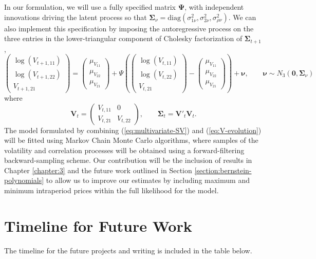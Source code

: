 	In our formulation, we will use a fully specified matrix $\boldsymbol{\Psi}$, with independent innovations driving the latent process so that $\boldsymbol{\Sigma}_{\nu} = \mbox{diag}(\sigma^2_{1\nu}, \sigma^2_{2\nu}, \sigma^2_{\rho\nu})$. We can also implement this specification by imposing the autoregressive process on the three entries in the lower-triangular component of Cholesky factorization of $\boldsymbol{\Sigma}_{t+1}$, 
\begin{equation}
	\left( \begin{array}{c} \log(V_{t+1,11}) \\ \log(V_{t+1,22}) \\ V_{t+1, 21} \end{array} \right) = \left( \begin{array}{c} \mu_{V_{11}} \\ \mu_{V_{22}} \\ \mu_{V_{21}} \end{array} \right) + \Psi \left( \left( \begin{array}{c} \log(V_{t,11}) \\ \log(V_{t,22}) \\ V_{t, 21} \end{array} \right) -\left( \begin{array}{c} \mu_{V_{11}} \\ \mu_{V_{22}} \\ \mu_{V_{21}} \end{array} \right) \right) + \boldsymbol{\nu}, \qquad \boldsymbol{\nu} \sim N_3(\mathbf{0}, \boldsymbol{\Sigma}_\nu) \label{eq:V-evolution}
\end{equation}
where
\[
 	\mathbf{V}_{t} = \left( \begin{array}{cc} 
					V_{t,11} & 0 \\
					V_{t,21} & V_{t,22}
					\end{array} \right), \qquad \boldsymbol{\Sigma}_t = \mathbf{V}'_{t} \mathbf{V}_t.
\]
The model formulated by combining (\ref{eq:multivariate-SV}) and (\ref{eq:V-evolution}) will be fitted using Markov Chain Monte Carlo algorithms, where samples of the volatility and correlation processes will be obtained using a forward-filtering backward-sampling scheme. Our contribution will be the inclusion of results in Chapter \ref{chapter:3} and the future work outlined in Section \ref{section:bernstein-polynomials} to allow us to improve our estimates by including maximum and minimum intraperiod prices within the full likelihood for the model.

\section{Timeline for Future Work}

The timeline for the future projects and writing is included in the table below. 

\placeTimeline{.7cm}{5cm}
